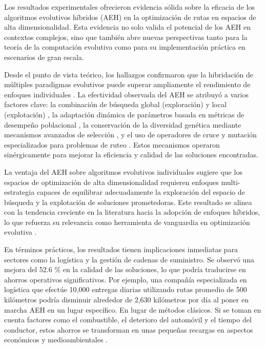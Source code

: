 \documentclass[conference]{IEEEtran}
\begin{document}
Los resultados experimentales ofrecieron evidencia sólida sobre la eficacia de los algoritmos evolutivos híbridos (AEH) en la optimización de rutas en espacios de alta dimensionalidad. Esta evidencia no solo valida el potencial de los AEH en contextos complejos, sino que también abre nuevas perspectivas tanto para la teoría de la computación evolutiva como para su implementación práctica en escenarios de gran escala.

Desde el punto de vista teórico, los hallazgos confirmaron que la hibridación de múltiples paradigmas evolutivos puede superar ampliamente el rendimiento de enfoques individuales \cite{talbi2002,coello2007}. La efectividad observada del AEH se atribuyó a varios factores clave: la combinación de búsqueda global (exploración) y local (explotación) \cite{blum2003,voudouris2003}, la adaptación dinámica de parámetros basada en métricas de desempeño poblacional \cite{brest2006,zhang2008}, la conservación de la diversidad genética mediante mecanismos avanzados de selección \cite{blickle1996}, y el uso de operadores de cruce y mutación especializados para problemas de ruteo \cite{toth2014,rego2011}. Estos mecanismos operaron sinérgicamente para mejorar la eficiencia y calidad de las soluciones encontradas.


La ventaja del AEH sobre algoritmos evolutivos individuales sugiere que los espacios de optimización de alta dimensionalidad requieren enfoques multi-estrategia capaces de equilibrar adecuadamente la exploración del espacio de búsqueda y la explotación de soluciones prometedoras. Este resultado se alinea con la tendencia creciente en la literatura hacia la adopción de enfoques híbridos, lo que refuerza su relevancia como herramienta de vanguardia en optimización evolutiva \cite{talbi2002}.


En términos prácticos, los resultados tienen implicaciones inmediatas para sectores como la logística y la gestión de cadenas de suministro. Se observó una mejora del 52.6 \% en la calidad de las soluciones, lo que podría traducirse en ahorros operativos significativos. Por ejemplo, una compañía especializada en logística que efectúe 10,000 entregas diarias utilizando rutas promedio de 500 kilómetros podría disminuir alrededor de
2,630 kilómetros por día al poner en marcha AEH en un lugar específico.
En lugar de métodos clásicos. Si se toman en cuenta factores como el combustible, el deterioro del automóvil y el tiempo del conductor, estos ahorros se transforman en unas pequeñas recargas en aspectos económicos y medioambientales \cite{toth2014}.
\end{document}
